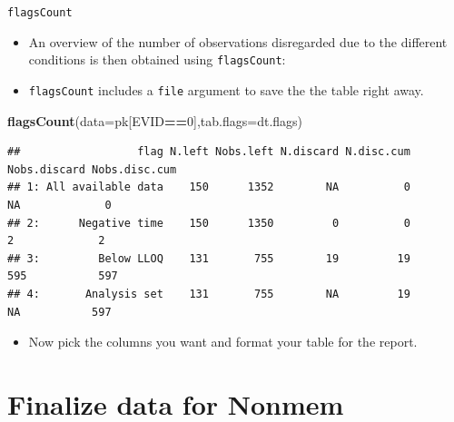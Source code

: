 \documentclass[
  8pt,
  ignorenonframetext,
  aspectratio=169]{beamer}
\newenvironment{Shaded}{\begin{snugshade}}{\end{snugshade}}
\newcommand{\DataTypeTok}[1]{\textcolor[rgb]{0.13,0.29,0.53}{#1}}
\newcommand{\DecValTok}[1]{\textcolor[rgb]{0.00,0.00,0.81}{#1}}
\newcommand{\KeywordTok}[1]{\textcolor[rgb]{0.13,0.29,0.53}{\textbf{#1}}}
\newcommand{\NormalTok}[1]{#1}
\newcommand{\OperatorTok}[1]{\textcolor[rgb]{0.81,0.36,0.00}{\textbf{#1}}}
\providecommand{\tightlist}{%
  \setlength{\itemsep}{0pt}\setlength{\parskip}{0pt}}
\begin{document}
\begin{frame}[fragile]{\texttt{flagsCount}}
\protect\hypertarget{flagscount}{}
\begin{itemize}
\item
  An overview of the number of observations disregarded due to the
  different conditions is then obtained using \texttt{flagsCount}:
\item
  \texttt{flagsCount} includes a \texttt{file} argument to save the the
  table right away.
\end{itemize}

\footnotesize

\begin{Shaded}
\begin{Highlighting}[]
\KeywordTok{flagsCount}\NormalTok{(}\DataTypeTok{data=}\NormalTok{pk[EVID}\OperatorTok{==}\DecValTok{0}\NormalTok{],}\DataTypeTok{tab.flags=}\NormalTok{dt.flags)}
\end{Highlighting}
\end{Shaded}

\begin{verbatim}
##                  flag N.left Nobs.left N.discard N.disc.cum Nobs.discard Nobs.disc.cum
## 1: All available data    150      1352        NA          0           NA             0
## 2:      Negative time    150      1350         0          0            2             2
## 3:         Below LLOQ    131       755        19         19          595           597
## 4:       Analysis set    131       755        NA         19           NA           597
\end{verbatim}

\begin{itemize}
\tightlist
\item
  Now pick the columns you want and format your table for the report.
\end{itemize}
\end{frame}

\hypertarget{finalize-data-for-nonmem}{%
\section{Finalize data for Nonmem}\label{finalize-data-for-nonmem}}
\end{document}
